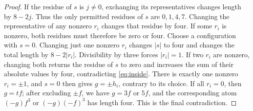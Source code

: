 \documentclass[11pt]{article}
\theoremstyle{definition}
\begin{document}
\begin{proof}
If the residue of $s$ is $j\neq0$, exchanging its representatives changes length by $8-2j$. Thus the only permitted residues of $s$ are $0,1,4,7$. Changing the representative of any nonzero $r_i$ changes that residue by four. If some $r_i$ is nonzero, both residues must therefore be zero or four. Choose a configuration with $s=0$. Changing just one nonzero $r_i$ changes $|s|$ to four and changes the total length by $8-2|r_i|$. Divisibility by three forces $|r_i|=1$. If two $r_i$ are nonzero, changing both returns the residue of $s$ to zero and increases the sum of their absolute values by four, contradicting \eqref{eq:inside}. There is exactly one nonzero $r_i=\pm1$, and $s=0$ then gives $g=\pm h_i$, contrary to its choice. If all $r_i=0$, then $g=t f$; after excluding $\pm f$, we have $g=3f$ or $5f$, and the corresponding atom $(-g)f^3$ or $(-g)(-f)^3$ has length four. This is the final contradiction.
\end{proof}
\end{document}
